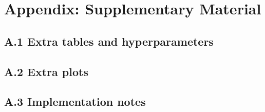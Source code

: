 \chapter{Appendix: Supplementary Material}


\section{A.1 Extra tables and hyperparameters}




\section{A.2 Extra plots}




\section{A.3 Implementation notes}




